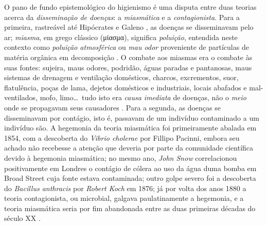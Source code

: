 O pano de fundo epistemológico do higienismo é uma disputa entre duas teorias acerca da \textit{disseminação de doenças}: a \textit{miasmática} e a \textit{contagionista}. Para a primeira, rastreável até Hipócrates e Galeno \cite{sterner_miasmic_2007}, as doenças se disseminavam pelo ar; \textit{miasma}, em grego clássico (\textgreek{μίασμα}), significa \textit{poluição}, entendida neste contexto como \textit{poluição atmosférica} ou \textit{mau odor} proveniente de partículas de matéria orgânica em decomposição \cite{mehlhorn2008encyclopedia}. O combate aos miasmas era o combate às suas fontes: sujeira, maus odores, podridão, águas paradas e pantanosas, maus sistemas de drenagem e ventilação domésticos, charcos, excrementos, suor, flatulência, poças de lama, dejetos domésticos e industriais, locais abafados e mal-ventilados, mofo, limo\dots\ tudo isto era \textit{causa imediata} de doenças, não o \textit{meio} onde se propagavam seus causadores \cite{baldwin_air_2003,halliday_miaslond_2001}. Para a segunda, as doenças se disseminavam por contágio, isto é, passavam de um indivíduo contaminado a um indivíduo são. A hegemonia da teoria miasmática foi primeiramente abalada em 1854, com a descoberta do \textit{Vibrio cholerae} por Fillipo Pacinni, embora seu achado não recebesse a atenção que deveria por parte da comunidade científica devido à hegemonia miasmática; no mesmo ano, \textit{John Snow} correlacionou positivamente em Londres o contágio de cólera ao uso da água duma bomba em Broad Street cuja fonte estava contaminada; outro golpe severo foi a descoberta do \textit{Bacillus anthracis} por \textit{Robert Koch} em 1876; já por volta dos anos 1880 a teoria contagionista, ou microbial, galgava paulatinamente a hegemonia, e a teoria miasmática seria por fim abandonada entre as duas primeiras décadas do século XX \cite{bynum_histmed_2011,mehlhorn2008encyclopedia}.

